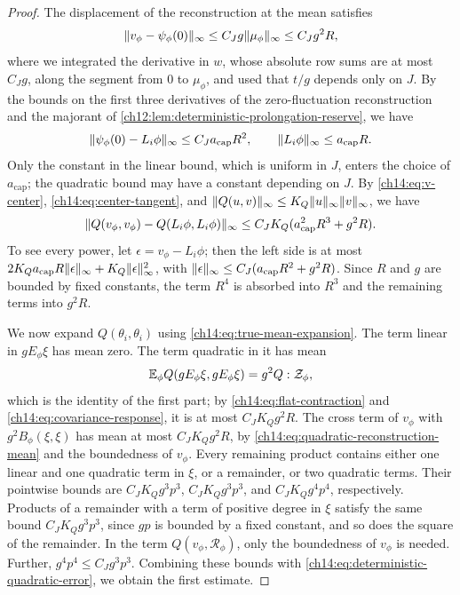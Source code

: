 \begin{proof}
The displacement of the reconstruction at the mean satisfies
\begin{equation}\label{ch14:eq:v-center}
 \lVert v_\phi-\psi_\phi(0)\rVert_\infty\le C_Jg\lVert \mu_\phi\rVert_\infty\le C_Jg^2R,
\end{equation}
where we integrated the derivative in $w$, whose absolute row sums are at most $C_Jg$, along the segment from $0$ to $\mu_\phi$, and used that $t/g$ depends only on $J$. By the bounds on the first three derivatives of the zero-fluctuation reconstruction and the majorant of \cref{ch12:lem:deterministic-prolongation-reserve}, we have
\begin{equation}\label{ch14:eq:center-tangent}
 \lVert \psi_\phi(0)-L_i\phi\rVert_\infty\le C_Ja_{\mathrm{cap}}R^2,\qquad\lVert L_i\phi\rVert_\infty\le a_{\mathrm{cap}}R.
\end{equation}
Only the constant in the linear bound, which is uniform in $J$, enters the choice of $a_{\mathrm{cap}}$; the quadratic bound may have a constant depending on $J$. By \eqref{ch14:eq:v-center}, \eqref{ch14:eq:center-tangent}, and $\lVert Q(u,v)\rVert_\infty\le K_Q\lVert u\rVert_\infty\lVert v\rVert_\infty$, we have
\begin{equation}\label{ch14:eq:deterministic-quadratic-error}
 \lVert Q(v_\phi,v_\phi)-Q(L_i\phi,L_i\phi)\rVert_\infty\le C_JK_Q(a_{\mathrm{cap}}^2R^3+g^2R).
\end{equation}
To see every power, let $\epsilon=v_\phi-L_i\phi$; then the left side is at most $2K_Qa_{\mathrm{cap}}R\lVert \epsilon\rVert_\infty+K_Q\lVert \epsilon\rVert_\infty^2$, with $\lVert \epsilon\rVert_\infty\le C_J(a_{\mathrm{cap}}R^2+g^2R)$. Since $R$ and $g$ are bounded by fixed constants, the term $R^4$ is absorbed into $R^3$ and the remaining terms into $g^2R$.

We now expand $Q(\theta_i,\theta_i)$ using \eqref{ch14:eq:true-mean-expansion}. The term linear in $gE_\phi\xi$ has mean zero. The term quadratic in it has mean
\[
 \mathbb E_\phi Q(gE_\phi\xi,gE_\phi\xi)=g^2Q:\mathcal Z_\phi,
\]
which is the identity of the first part; by \eqref{ch14:eq:flat-contraction} and \eqref{ch14:eq:covariance-response}, it is at most $C_JK_Qg^2R$. The cross term of $v_\phi$ with $g^2B_\phi(\xi,\xi)$ has mean at most $C_JK_Qg^2R$, by \eqref{ch14:eq:quadratic-reconstruction-mean} and the boundedness of $v_\phi$. Every remaining product contains either one linear and one quadratic term in $\xi$, or a remainder, or two quadratic terms. Their pointwise bounds are $C_JK_Qg^3p^3$, $C_JK_Qg^3p^3$, and $C_JK_Qg^4p^4$, respectively. Products of a remainder with a term of positive degree in $\xi$ satisfy the same bound $C_JK_Qg^3p^3$, since $gp$ is bounded by a fixed constant, and so does the square of the remainder. In the term $Q(v_\phi,\mathcal R_\phi)$, only the boundedness of $v_\phi$ is needed. Further, $g^4p^4\le C_Jg^3p^3$. Combining these bounds with \eqref{ch14:eq:deterministic-quadratic-error}, we obtain the first estimate. 


\end{proof}
